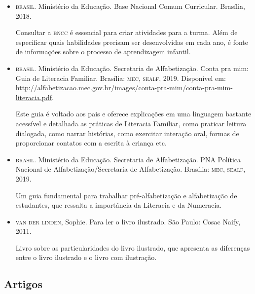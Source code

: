 \documentclass[11pt]{extarticle}
\begin{document}
\begin{itemize}
\item \textsc{brasil}. Ministério da Educação. Base Nacional Comum Curricular. Brasília, 2018.

Consultar a \textsc{bncc} é essencial para criar atividades para a turma. Além de especificar 
quais habilidades precisam ser desenvolvidas em cada ano, é fonte de informações sobre 
o processo de aprendizagem infantil. 

\item \textsc{brasil}. Ministério da Educação. Secretaria de Alfabetização. Conta pra mim: Guia de Literacia Familiar. 
Brasília: \textsc{mec, sealf}, 2019. Disponível em: \url{http://alfabetizacao.mec.gov.br/images/conta-pra-mim/conta-pra-mim-literacia.pdf}.

Este guia é voltado aos pais e oferece explicações em uma linguagem bastante acessível e detalhada as práticas de Literacia Familiar, 
como praticar leitura dialogada, como narrar histórias, como exercitar interação oral, formas de proporcionar contatos com a escrita à criança etc. 
 
\item \textsc{brasil}. Ministério da Educação. Secretaria de Alfabetização. PNA Política Nacional de Alfabetização/Secretaria 
de Alfabetização. Brasília: \textsc{mec, sealf}, 2019.

Um guia fundamental para trabalhar pré-alfabetização e alfabetização de estudantes, que ressalta a importância da Literacia e da Numeracia.

\item \textsc{van der linden}, Sophie. Para ler o livro ilustrado. São Paulo: Cosac Naify, 2011.

Livro sobre as particularidades do livro ilustrado, que apresenta as diferenças entre o livro ilustrado e o livro com ilustração. 
\end{itemize}

\subsection{Artigos}
\end{document}
